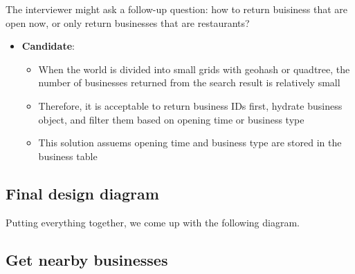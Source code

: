 \documentclass{report}
\theoremstyle{definition}
\let\oldsubsection\subsection
\renewcommand{\subsection}{\oldsubsection*}
\begin{document}
The interviewer might ask a follow-up question: how to return buisiness that are open now, or only return businesses that are restaurants?

\begin{itemize}
\item
\textbf{Candidate}:

\begin{itemize}
\item
When the world is divided into small grids with geohash or quadtree, the number of businesses returned from the search result is relatively small
\item
Therefore, it is acceptable to return business IDs first, hydrate business object, and filter them based on opening time or business type
\item
This solution assuems opening time and business type are stored in the business table
\end{itemize}
\end{itemize}

\subsection{Final design diagram}

Putting everything together, we come up with the following diagram.

\subsection{Get nearby businesses}
\end{document}
